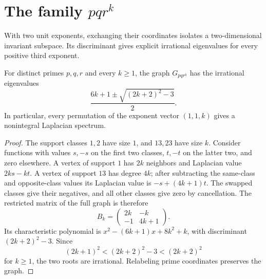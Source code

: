 \section{The family \texorpdfstring{$pq r^k$}{pq r to the k}}

With two unit exponents, exchanging their coordinates isolates a
two-dimensional invariant subspace. Its discriminant gives explicit
irrational eigenvalues for every positive third exponent.

\begin{theorem}
\label{thm:pqrk}
For distinct primes $p,q,r$ and every $k\geq1$, the graph $G_{pq r^k}$
has the irrational eigenvalues
\[
\frac{6k+1\pm\sqrt{(2k+2)^2-3}}2.
\]
In particular, every permutation of the exponent vector $(1,1,k)$
gives a nonintegral Laplacian spectrum.
\end{theorem}
\begin{proof}
The support classes $1,2$ have size $1$, and $13,23$ have size $k$.
Consider functions with values $s,-s$ on the first two classes,
$t,-t$ on the latter two, and zero elsewhere.
A vertex of support $1$ has $2k$ neighbors and Laplacian value
$2ks-kt$. A vertex of support $13$ has degree $4k$; after subtracting
the same-class and opposite-class values its Laplacian value is
$-s+(4k+1)t$. The swapped classes give their negatives, and all other
classes give zero by cancellation. The restricted matrix of the full
graph is therefore
\[
B_k=\begin{pmatrix}2k&-k\\-1&4k+1\end{pmatrix}.
\]
Its characteristic polynomial is $x^2-(6k+1)x+8k^2+k$, with
discriminant $(2k+2)^2-3$. Since
\[
(2k+1)^2<(2k+2)^2-3<(2k+2)^2
\]
for $k\geq1$, the two roots are irrational. Relabeling prime coordinates
preserves the graph.
\end{proof}
